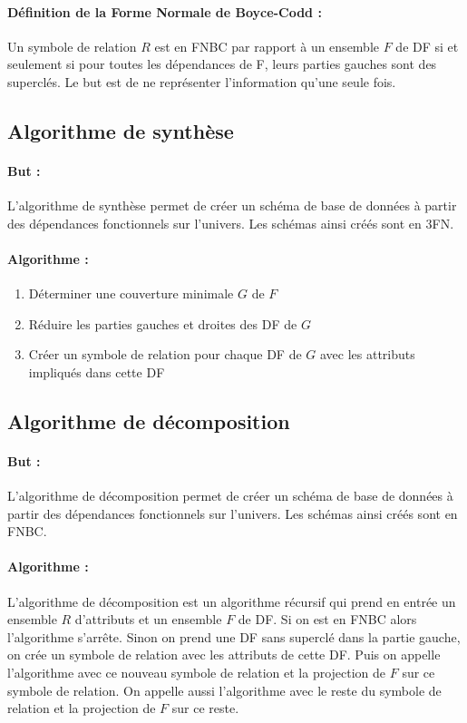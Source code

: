 \documentclass[10pt,a4paper]{article}
\begin{document}
\paragraph{Définition de la Forme Normale de Boyce-Codd :} Un symbole de relation $R$ est en FNBC par rapport à un ensemble $F$ de DF si et seulement si pour toutes les dépendances de F, leurs parties gauches sont des superclés. Le but est de ne représenter l'information qu'une seule fois.

\subsection{Algorithme de synthèse}
\paragraph{But :} L'algorithme de synthèse permet de créer un schéma de base de données à partir des dépendances fonctionnels sur l'univers. Les schémas ainsi créés sont en 3FN.

\paragraph{Algorithme :}
\begin{enumerate}
\item Déterminer une couverture minimale $G$ de $F$
\item Réduire les parties gauches et droites des DF de $G$
\item Créer un symbole de relation pour chaque DF de $G$ avec les attributs impliqués dans cette DF
\end{enumerate}

\subsection{Algorithme de décomposition}
\paragraph{But :} L'algorithme de décomposition permet de créer un schéma de base de données à partir des dépendances fonctionnels sur l'univers. Les schémas ainsi créés sont en FNBC.

\paragraph{Algorithme :} L'algorithme de décomposition est un algorithme récursif qui prend en entrée un ensemble $R$ d'attributs et un ensemble $F$ de DF. Si on est en FNBC alors l'algorithme s'arrête. Sinon on prend une DF sans superclé dans la partie gauche, on crée un symbole de relation avec les attributs de cette DF. Puis on appelle l'algorithme avec ce nouveau symbole de relation et la projection de $F$ sur ce symbole de relation. On appelle aussi l'algorithme avec le reste du symbole de relation et la projection de $F$ sur ce reste.\\
\end{document}
